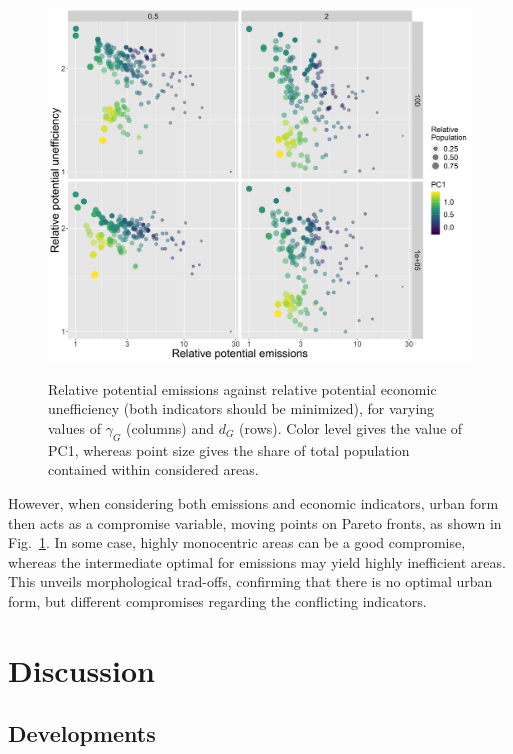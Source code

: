 \documentclass{jimis-en}
\begin{document}
\begin{figure}[ht] 
  {\includegraphics[width=\linewidth]{figures/aggreg_morpho_relemissions-relefficiency_colpc1_logscale_targeted.png}}
  \centering  
  \caption{Relative potential emissions against relative potential economic unefficiency (both indicators should be minimized), for varying values of $\gamma_G$ (columns) and $d_G$ (rows). Color level gives the value of PC1, whereas point size gives the share of total population contained within considered areas.\label{fig:paretos-relative}}
\end{figure}


However, when considering both emissions and economic indicators, urban form then acts as a compromise variable, moving points on Pareto fronts, as shown in Fig.~\ref{fig:paretos-relative}. In some case, highly monocentric areas can be a good compromise, whereas the intermediate optimal for emissions may yield highly inefficient areas. This unveils morphological trad-offs, confirming that there is no optimal urban form, but different compromises regarding the conflicting indicators.




\section{Discussion}



\subsection{Developments}
\end{document}
